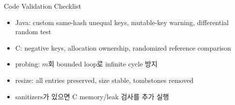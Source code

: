 \begin{frame}{Code Validation Checklist}
\begin{itemize}\item Java: custom same-hash unequal keys, mutable-key warning, differential random test\item C: negative keys, allocation ownership, randomized reference comparison\item probing: $m$회 bounded loop로 infinite cycle 방지\item resize: all entries preserved, size stable, tombstones removed\item sanitizers가 있으면 C memory/leak 검사를 추가 실행\end{itemize}
\end{frame}

